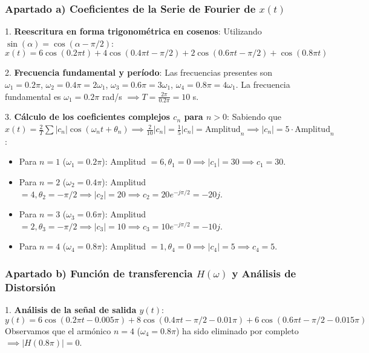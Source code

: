 \begin{resolucion}
\subsubsection*{Apartado a) Coeficientes de la Serie de Fourier de $x(t)$}

1. \textbf{Reescritura en forma trigonométrica en cosenos}:
   Utilizando $\sin(\alpha) = \cos(\alpha - \pi/2)$:
   \[
   x(t) = 6\cos(0.2\pi t) + 4\cos(0.4\pi t - \pi/2) + 2\cos(0.6\pi t - \pi/2) + \cos(0.8\pi t)
   \]

2. \textbf{Frecuencia fundamental y período}:
   Las frecuencias presentes son $\omega_1 = 0.2\pi$, $\omega_2 = 0.4\pi = 2\omega_1$, $\omega_3 = 0.6\pi = 3\omega_1$, $\omega_4 = 0.8\pi = 4\omega_1$.
   La frecuencia fundamental es $\omega_1 = 0.2\pi$ rad/s $\implies T = \frac{2\pi}{0.2\pi} = 10$ s.

3. \textbf{Cálculo de los coeficientes complejos $c_n$ para $n > 0$}:
   Sabiendo que $x(t) = \frac{2}{T} \sum |c_n| \cos(\omega_n t + \theta_n) \implies \frac{2}{10} |c_n| = \frac{1}{5} |c_n| = \text{Amplitud}_n \implies |c_n| = 5 \cdot \text{Amplitud}_n$:
   \begin{itemize}
       \item Para $n=1$ ($\omega_1 = 0.2\pi$): Amplitud $= 6, \theta_1 = 0 \implies |c_1| = 30 \implies c_1 = 30$.
       \item Para $n=2$ ($\omega_2 = 0.4\pi$): Amplitud $= 4, \theta_2 = -\pi/2 \implies |c_2| = 20 \implies c_2 = 20 e^{-j\pi/2} = -20j$.
       \item Para $n=3$ ($\omega_3 = 0.6\pi$): Amplitud $= 2, \theta_3 = -\pi/2 \implies |c_3| = 10 \implies c_3 = 10 e^{-j\pi/2} = -10j$.
       \item Para $n=4$ ($\omega_4 = 0.8\pi$): Amplitud $= 1, \theta_4 = 0 \implies |c_4| = 5 \implies c_4 = 5$.
   \end{itemize}

\subsubsection*{Apartado b) Función de transferencia $H(\omega)$ y Análisis de Distorsión}

1. \textbf{Análisis de la señal de salida $y(t)$}:
   \[
   y(t) = 6\cos(0.2\pi t - 0.005\pi) + 8\cos(0.4\pi t - \pi/2 - 0.01\pi) + 6\cos(0.6\pi t - \pi/2 - 0.015\pi)
   \]
   Observamos que el armónico $n=4$ ($\omega_4 = 0.8\pi$) ha sido eliminado por completo $\implies |H(0.8\pi)| = 0$.


\end{resolucion}

